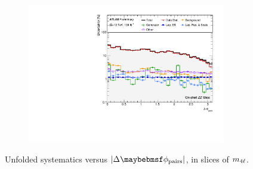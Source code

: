 \begin{figure}[hp]
    \begin{subfigure}{.49\textwidth}\centering\includegraphics[width = 0.95\textwidth]{Figures/m4l/Systematics/Unfolded/UnfoldedSys_dPhiPairs_vs_M4l_Stack_Paper3.pdf}\end{subfigure}
    \caption{Unfolded systematics versus $\dPhiPairs$, in slices of $m_{4\ell}$.}
\end{figure}

